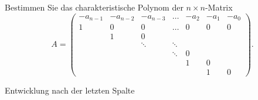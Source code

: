 Bestimmen Sie das charakteristische Polynom der $n\times n$-Matrix
\[
A=\begin{pmatrix}
-a_{n-1}&-a_{n-2}&-a_{n-3}&\dots & -a_2 & -a_1 & -a_0 \\
   1    &   0    &   0    &\dots &   0  &   0  &   0  \\
        &   1    &   0    &      &      &      &      \\
        &        &\ddots  &\ddots&      &      &      \\
        &        &        &\ddots&   0  &      &      \\
        &        &        &      &   1  &   0  &      \\
        &        &        &      &      &   1  &   0  
\end{pmatrix}.
\]

\begin{hinweis}Entwicklung nach der letzten Spalte
\end{hinweis}

